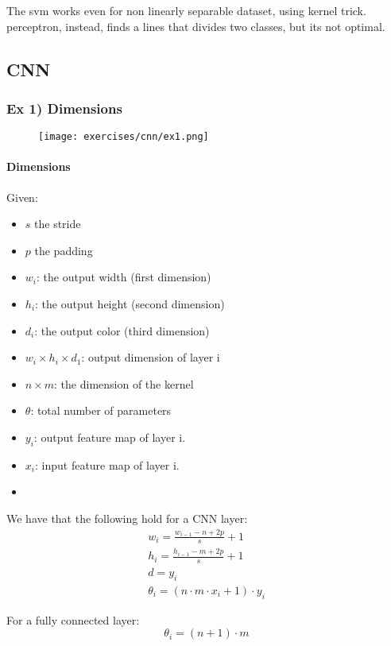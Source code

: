 The svm works even for non linearly separable dataset, using kernel trick. perceptron, instead, finds a lines that divides two classes, but its not optimal.


\subsection{CNN}


\subsubsection{Ex 1) Dimensions}
\begin{figure}[H]
    \centering
    \texttt{[image: exercises/cnn/ex1.png]}
\end{figure}

\paragraph{Dimensions}
Given:
\begin{itemize}
\item $s$ the stride 
\item $p$ the padding
\item $w_i$: the output width (first dimension)
\item $h_i$: the output height (second dimension)
\item $d_i$: the output color (third dimension)
\item $w_i\times h_i\times d_1$: output dimension of layer i
\item $n\times m$: the dimension of the kernel
\item $\theta$: total number of parameters
\item $y_i$: output feature map of layer i.
\item $x_i$: input feature map of layer i.
\item 
\end{itemize}

We have that the following hold for a CNN layer:
\begin{equation}
\begin{aligned}
w_i=\frac{w_{i-1}-n+2p}{s}+1\\
h_i=\frac{h_{i-1}-m+2p}{s}+1\\
d=y_i\\
\theta_i=(n\cdot m \cdot x_i+1)\cdot  y_i 
\end{aligned}
\end{equation}

For a fully connected layer:
$$\theta_i=(n +1)\cdot m $$

